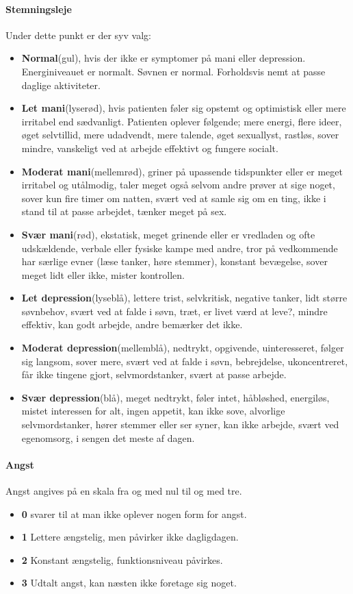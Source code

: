 \paragraph{Stemningsleje}
Under dette punkt er der syv valg:
\begin{itemize}
	\item \textbf{Normal}(gul), hvis der ikke er symptomer på mani eller depression. Energiniveauet er normalt. Søvnen er normal. Forholdsvis nemt at passe daglige aktiviteter.
	\item \textbf{Let mani}(lyserød), hvis patienten føler sig opstemt og optimistisk eller mere irritabel end sædvanligt. Patienten oplever følgende; mere energi, flere ideer, øget selvtillid, mere udadvendt, mere talende, øget sexuallyst, rastløs, sover mindre, vanskeligt ved at arbejde effektivt og fungere socialt.
	\item \textbf{Moderat mani}(mellemrød), griner på upassende tidspunkter eller er meget irritabel og utålmodig, taler meget også selvom andre prøver at sige noget, sover kun fire timer om natten, svært ved at samle sig om en ting, ikke i stand til at passe arbejdet, tænker meget på sex.
	\item \textbf{Svær mani}(rød), ekstatisk, meget grinende eller er vredladen og ofte udskældende, verbale eller fysiske kampe med andre, tror på vedkommende har særlige evner (læse tanker, høre stemmer), konstant bevægelse, sover meget lidt eller ikke, mister kontrollen.
	\item \textbf{Let depression}(lyseblå), lettere trist, selvkritisk, negative tanker, lidt større søvnbehov, svært ved at falde i søvn, træt, er livet værd at leve?, mindre effektiv, kan godt arbejde, andre bemærker det ikke.
	\item \textbf{Moderat depression}(mellemblå), nedtrykt, opgivende, uinteresseret, følger sig langsom, sover mere, svært ved at falde i søvn, bebrejdelse, ukoncentreret, får ikke tingene gjort, selvmordstanker, svært at passe arbejde.
	\item \textbf{Svær depression}(blå), meget nedtrykt, føler intet, håbløshed, energiløs, mistet interessen for alt, ingen appetit, kan ikke sove, alvorlige selvmordstanker, hører stemmer eller ser syner, kan ikke arbejde, svært ved egenomsorg, i sengen det meste af dagen.
\end{itemize}

\paragraph{Angst}
Angst angives på en skala fra og med nul til og med tre.
\begin{itemize}
	\item \textbf{0} svarer til at man ikke oplever nogen form for angst.
	\item \textbf{1} Lettere ængstelig, men påvirker ikke dagligdagen.
	\item \textbf{2} Konstant ængstelig, funktionsniveau påvirkes.
	\item \textbf{3} Udtalt angst, kan næsten ikke foretage sig noget.
\end{itemize}

